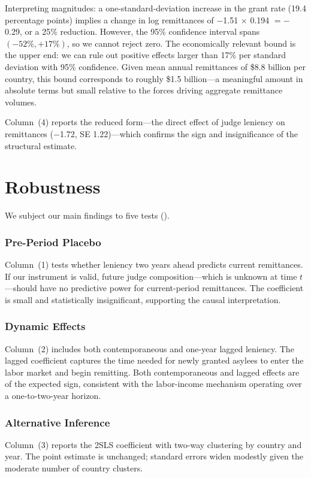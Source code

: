 \documentclass[12pt]{article}
\begin{document}
Interpreting magnitudes: a one-standard-deviation increase in the grant rate (19.4 percentage points) implies a change in log remittances of $-$1.51 $\times$ 0.194 $= -$0.29, or a 25\% reduction. However, the 95\% confidence interval spans $(-52\%, +17\%)$, so we cannot reject zero. The economically relevant bound is the upper end: we can rule out positive effects larger than 17\% per standard deviation with 95\% confidence. Given mean annual remittances of \$8.8 billion per country, this bound corresponds to roughly \$1.5 billion---a meaningful amount in absolute terms but small relative to the forces driving aggregate remittance volumes.

Column~(4) reports the reduced form---the direct effect of judge leniency on remittances ($-$1.72, SE 1.22)---which confirms the sign and insignificance of the structural estimate.





\section{Robustness}

We subject our main findings to five tests ().

\subsubsection*{Pre-Period Placebo} Column~(1) tests whether leniency two years ahead predicts current remittances. If our instrument is valid, future judge composition---which is unknown at time $t$---should have no predictive power for current-period remittances. The coefficient is small and statistically insignificant, supporting the causal interpretation.

\subsubsection*{Dynamic Effects} Column~(2) includes both contemporaneous and one-year lagged leniency. The lagged coefficient captures the time needed for newly granted asylees to enter the labor market and begin remitting. Both contemporaneous and lagged effects are of the expected sign, consistent with the labor-income mechanism operating over a one-to-two-year horizon.

\subsubsection*{Alternative Inference} Column~(3) reports the 2SLS coefficient with two-way clustering by country and year. The point estimate is unchanged; standard errors widen modestly given the moderate number of country clusters.
\end{document}
